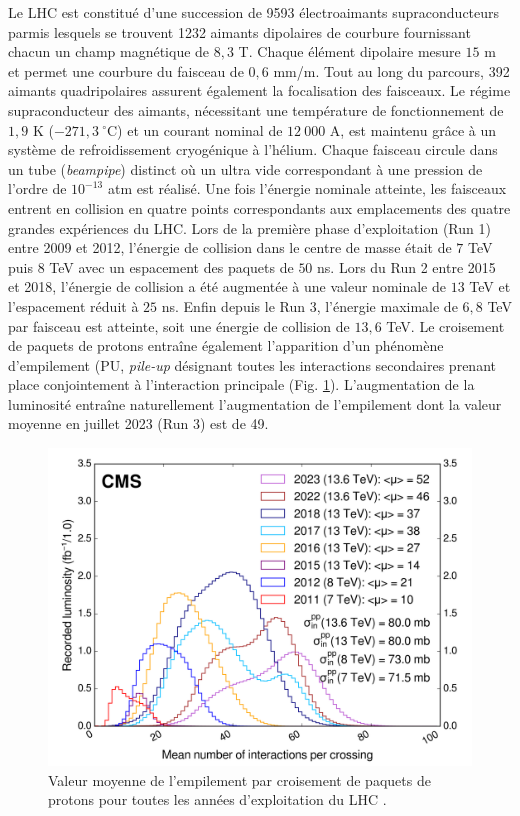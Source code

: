 Le LHC est constitué d'une succession de 9593 électroaimants supraconducteurs parmis lesquels se trouvent 1232 aimants dipolaires de courbure fournissant chacun un champ magnétique de $8,3$ T. Chaque élément dipolaire mesure $15$ m et permet une courbure du faisceau de $0,6$ mm/m. Tout au long du parcours, 392 aimants quadripolaires assurent également la focalisation des faisceaux. Le régime supraconducteur des aimants, nécessitant une température de fonctionnement de $1,9$ K ($-271,3~^\circ$C) et un courant nominal de $12~000$ A, est maintenu grâce à un système de refroidissement cryogénique à l'hélium. Chaque faisceau circule dans un tube (\textit{beampipe}) distinct où un ultra vide correspondant à une pression de l'ordre de $10^{-13}$ atm est réalisé. Une fois l'énergie nominale atteinte, les faisceaux entrent en collision en quatre points correspondants aux emplacements des quatre grandes expériences du LHC. Lors de la première phase d'exploitation (Run 1) entre 2009 et 2012, l'énergie de collision dans le centre de masse était de $7$ TeV puis $8$ TeV avec un espacement des paquets de $50$ ns. Lors du Run 2 entre 2015 et 2018, l'énergie de collision a été augmentée à une valeur nominale de $13$ TeV et l'espacement réduit à $25$ ns. Enfin depuis le Run 3, l'énergie maximale de $6,8$ TeV par faisceau est atteinte, soit une énergie de collision de $13,6$ TeV. Le croisement de paquets de protons entraîne également l'apparition d'un phénomène d'empilement (PU, \textit{pile-up} désignant toutes les interactions secondaires prenant place conjointement à l'interaction principale (Fig. \ref{PU}). L'augmentation de la luminosité entraîne naturellement l'augmentation de l'empilement dont la valeur moyenne en juillet 2023 (Run 3) est de 49. \\

\begin{figure}
\centering
    \includegraphics[scale=0.5]{Chapitre3/Images/pileup_allYears.png} 
\caption{Valeur moyenne de l'empilement par croisement de paquets de protons pour toutes les années d'exploitation du LHC \cite{LumiTwiki}.}
\label{PU}
\end{figure}

